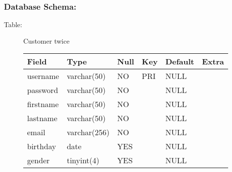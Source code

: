 \subsubsection{Database Schema:}
\begin{description}
\item[Table:] Customer twice

\begin{center}
    \begin{tabular}{ | l | l | l | l | l | l|}
    \hline
    Field & Type & Null & Key & Default & Extra \\ \hline \hline
    username & varchar(50) & NO & PRI & NULL & \hspace{1 pc} \\ \hline
    password & varchar(50) & NO & \hspace{1 pc} & NULL &\hspace{1 pc}  \\ \hline
    firstname & varchar(50) & NO & \hspace{1 pc}& NULL &\hspace{1 pc}  \\ \hline
    lastname & varchar(50) & NO &\hspace{1 pc} & NULL &\hspace{1 pc}  \\ \hline
    email & varchar(256) & NO &\hspace{1 pc} & NULL &\hspace{1 pc}   \\\hline
    birthday & date & YES &\hspace{1 pc} & NULL & \hspace{1 pc} \\ \hline
    gender & tinyint(4) & YES &\hspace{1 pc} & NULL &\hspace{1 pc}  \\
    \hline
    \end{tabular}
\end{center}


\end{description}
